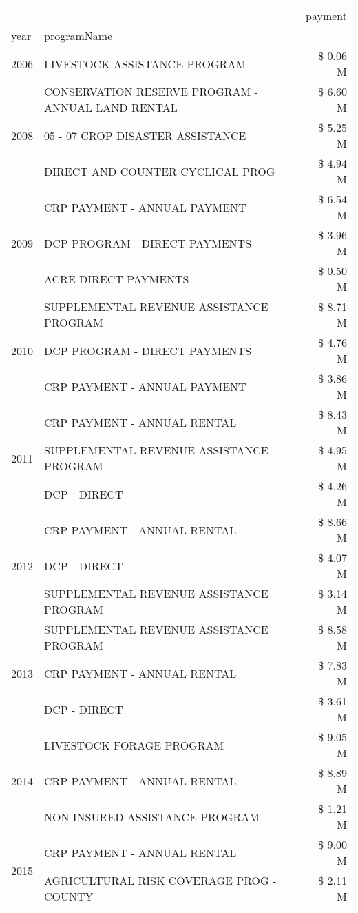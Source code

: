 \begin{tabular}{llr}
\toprule
 &  & payment \\
year & programName &  \\
\midrule
2006 & LIVESTOCK ASSISTANCE PROGRAM & \$ 0.06 M \\
\cline{1-3}
\multirow[t]{3}{*}{2008} & CONSERVATION RESERVE PROGRAM - ANNUAL LAND RENTAL & \$ 6.60 M \\
 & 05 - 07 CROP DISASTER ASSISTANCE & \$ 5.25 M \\
 & DIRECT AND COUNTER CYCLICAL PROG & \$ 4.94 M \\
\cline{1-3}
\multirow[t]{3}{*}{2009} & CRP PAYMENT - ANNUAL PAYMENT & \$ 6.54 M \\
 & DCP PROGRAM - DIRECT PAYMENTS & \$ 3.96 M \\
 & ACRE DIRECT PAYMENTS & \$ 0.50 M \\
\cline{1-3}
\multirow[t]{3}{*}{2010} & SUPPLEMENTAL REVENUE ASSISTANCE PROGRAM & \$ 8.71 M \\
 & DCP PROGRAM - DIRECT PAYMENTS & \$ 4.76 M \\
 & CRP PAYMENT - ANNUAL PAYMENT & \$ 3.86 M \\
\cline{1-3}
\multirow[t]{3}{*}{2011} & CRP PAYMENT - ANNUAL RENTAL & \$ 8.43 M \\
 & SUPPLEMENTAL REVENUE ASSISTANCE PROGRAM & \$ 4.95 M \\
 & DCP - DIRECT & \$ 4.26 M \\
\cline{1-3}
\multirow[t]{3}{*}{2012} & CRP PAYMENT - ANNUAL RENTAL & \$ 8.66 M \\
 & DCP - DIRECT & \$ 4.07 M \\
 & SUPPLEMENTAL REVENUE ASSISTANCE PROGRAM & \$ 3.14 M \\
\cline{1-3}
\multirow[t]{3}{*}{2013} & SUPPLEMENTAL REVENUE ASSISTANCE PROGRAM & \$ 8.58 M \\
 & CRP PAYMENT - ANNUAL RENTAL & \$ 7.83 M \\
 & DCP - DIRECT & \$ 3.61 M \\
\cline{1-3}
\multirow[t]{3}{*}{2014} & LIVESTOCK FORAGE PROGRAM & \$ 9.05 M \\
 & CRP PAYMENT - ANNUAL RENTAL & \$ 8.89 M \\
 & NON-INSURED ASSISTANCE PROGRAM & \$ 1.21 M \\
\cline{1-3}
\multirow[t]{3}{*}{2015} & CRP PAYMENT - ANNUAL RENTAL & \$ 9.00 M \\
 & AGRICULTURAL RISK COVERAGE PROG - COUNTY & \$ 2.11 M \\

\end{tabular}
